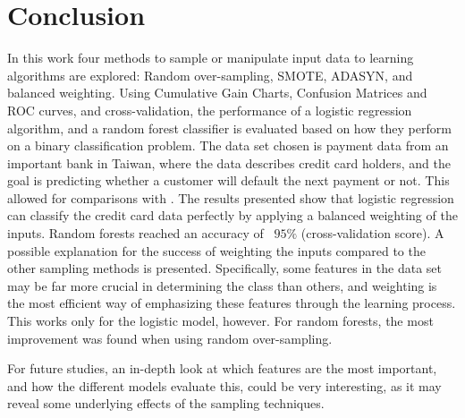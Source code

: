 \section{Conclusion}
In this work four methods to sample or manipulate input data to learning
algorithms are explored: Random over-sampling, SMOTE, ADASYN, and balanced
weighting.
Using Cumulative Gain Charts, Confusion Matrices and
ROC curves, and cross-validation, the performance of a logistic regression 
algorithm, and a random forest classifier is evaluated based on how they 
perform on a binary classification problem. 
The data set chosen is payment data from an important bank in Taiwan,
where the data describes credit card holders, and the goal is predicting
whether a customer will default the next payment or not. This allowed for
comparisons with \cite{ComparisonData}. The results presented show that
logistic regression can classify the credit card data perfectly by applying
a balanced weighting of the inputs. Random forests reached an accuracy of
~$95\%$ (cross-validation score). A possible explanation for the success of
weighting the inputs compared to the other sampling methods is presented. 
Specifically, some features in the data set may be far more crucial in
determining the class than others, and weighting is the most efficient way of
emphasizing these features through the learning process.
This works only for the logistic model, however. For random forests, the
most improvement was found when using random over-sampling.

For future studies, an in-depth look at which features are the most important,
and how the different models evaluate this, could be very interesting, as it
may reveal some underlying effects of the sampling techniques.

